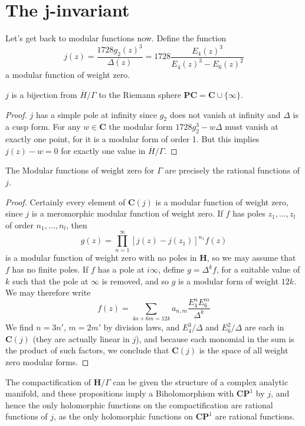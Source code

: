 \section{The j-invariant}

Let's get back to modular functions now. Define the function
%
\[ j(z) = \frac{1728 g_2(z)^3}{\Delta(z)} = 1728 \frac{E_4(z)^3}{E_4(z)^3 - E_6(z)^2} \]
%
a modular function of weight zero.

\begin{theorem}
    $j$ is a bijection from $\overline{H}/\Gamma$ to the Riemann sphere $\mathbf{P} \mathbf{C} = \mathbf{C} \cup \{ \infty \}$.
\end{theorem}
\begin{proof}
    $j$ has a simple pole at infinity since $g_2$ does not vanish at infinity and $\Delta$ is a cusp form. For any $w \in \mathbf{C}$ the modular form $1728 g_2^3 - w \Delta$ must vanish at exactly one point, for it is a modular form of order 1. But this implies $j(z) - w = 0$ for exactly one value in $\overline{H}/\Gamma$.
\end{proof}

\begin{theorem}
    The Modular functions of weight zero for $\Gamma$ are precisely the rational functions of $j$.
\end{theorem}
\begin{proof}
    Certainly every element of $\mathbf{C}(j)$ is a modular function of weight zero, since $j$ is a meromorphic modular function of weight zero. If $f$ has poles $z_1, \dots, z_l$ of order $n_1, \dots, n_l$, then
    \[ g(z) = \prod_{n = 1}^\infty [j(z) - j(z_1)]^{n_1} f(z) \]
    is a modular function of weight zero with no poles in $\mathbf{H}$, so we may assume that $f$ has no finite poles. If $f$ has a pole at $i \infty$, define $g = \Delta^k f$, for a suitable value of $k$ such that the pole at $\infty$ is removed, and so $g$ is a modular form of weight $12k$. We may therefore write
    \[ f(z) = \sum_{4n + 6m = 12k} a_{n,m} \frac{E_4^n E_6^m}{\Delta^k} \]
    We find $n = 3n'$, $m = 2m'$ by division laws, and $E_4^3/\Delta$ and $E_6^2/\Delta$ are each in $\mathbf{C}(j)$ (they are actually linear in $j$), and because each monomial in the sum is the product of such factors, we conclude that $\mathbf{C}(j)$ is the space of all weight zero modular forms.
\end{proof}

The compactification of $\mathbf{H}/\Gamma$ can be given the structure of a complex analytic manifold, and these propositions imply a Biholomorphism with $\mathbf{C} \mathbf{P}^1$ by $j$, and hence the only holomorphic functions on the compactification are rational functions of $j$, as the only holomorphic functions on $\mathbf{C} \mathbf{P}^1$ are rational functions.

